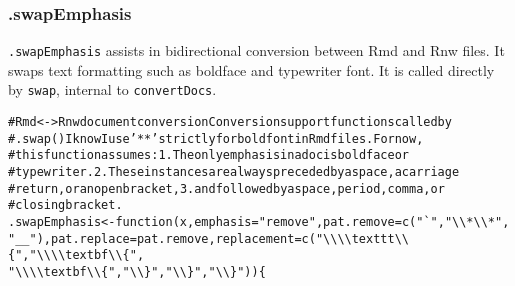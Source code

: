 \documentclass{article}\usepackage[]{graphicx}\usepackage[]{color}
\makeatletter
\newcommand{\hlstr}[1]{\textcolor[rgb]{0.863,0.196,0.184}{#1}}%
\newcommand{\hlcom}[1]{\textcolor[rgb]{0.345,0.431,0.459}{#1}}%
\newcommand{\hlstd}[1]{\textcolor[rgb]{0.514,0.58,0.588}{#1}}%
\newcommand{\hlkwa}[1]{\textcolor[rgb]{0.796,0.294,0.086}{#1}}%
\newcommand{\hlkwb}[1]{\textcolor[rgb]{0.522,0.6,0}{#1}}%
\newcommand{\hlkwc}[1]{\textcolor[rgb]{0.796,0.294,0.086}{#1}}%
\newcommand{\hlkwd}[1]{\textcolor[rgb]{0.576,0.631,0.631}{#1}}%
\newenvironment{kframe}{%
 \def\at@end@of@kframe{}%
 \ifinner\ifhmode%
  \def\at@end@of@kframe{\end{minipage}}%
  \begin{minipage}{\columnwidth}%
 \fi\fi%
 \def\FrameCommand##1{\hskip\@totalleftmargin \hskip-\fboxsep
 \colorbox{shadecolor}{##1}\hskip-\fboxsep
     \hskip-\linewidth \hskip-\@totalleftmargin \hskip\columnwidth}%
 \MakeFramed {\advance\hsize-\width
   \@totalleftmargin\z@ \linewidth\hsize
   \@setminipage}}%
 {\par\unskip\endMakeFramed%
 \at@end@of@kframe}
\newenvironment{knitrout}{}{} %
\makeatother
\begin{document}
\subsubsection{.swapEmphasis}
\texttt{.swapEmphasis} assists in bidirectional conversion between Rmd and Rnw files.
It swaps text formatting such as boldface and typewriter font.
It is called directly by \texttt{swap}, internal to \texttt{convertDocs}.


\begin{knitrout}
\color{fgcolor}\begin{kframe}
\begin{alltt}
\hlcom{# Rmd <-> Rnw document conversion Conversion support functions called by}
\hlcom{# .swap() I know I use '**' strictly for bold font in Rmd files.  For now,}
\hlcom{# this function assumes: 1. The only emphasis in a doc is boldface or}
\hlcom{# typewriter.  2. These instances are always preceded by a space, a carriage}
\hlcom{# return, or an open bracket, 3. and followed by a space, period, comma, or}
\hlcom{# closing bracket.}
\hlstd{.swapEmphasis} \hlkwb{<-} \hlkwa{function}\hlstd{(}\hlkwc{x}\hlstd{,} \hlkwc{emphasis} \hlstd{=} \hlstr{"remove"}\hlstd{,} \hlkwc{pat.remove} \hlstd{=} \hlkwd{c}\hlstd{(}\hlstr{"`"}\hlstd{,} \hlstr{"\textbackslash{}\textbackslash{}*\textbackslash{}\textbackslash{}*"}\hlstd{,}
    \hlstr{"__"}\hlstd{),} \hlkwc{pat.replace} \hlstd{= pat.remove,} \hlkwc{replacement} \hlstd{=} \hlkwd{c}\hlstd{(}\hlstr{"\textbackslash{}\textbackslash{}\textbackslash{}\textbackslash{}texttt\textbackslash{}\textbackslash{}\{"}\hlstd{,} \hlstr{"\textbackslash{}\textbackslash{}\textbackslash{}\textbackslash{}textbf\textbackslash{}\textbackslash{}\{"}\hlstd{,}
    \hlstr{"\textbackslash{}\textbackslash{}\textbackslash{}\textbackslash{}textbf\textbackslash{}\textbackslash{}\{"}\hlstd{,} \hlstr{"\textbackslash{}\textbackslash{}\}"}\hlstd{,} \hlstr{"\textbackslash{}\textbackslash{}\}"}\hlstd{,} \hlstr{"\textbackslash{}\textbackslash{}\}"}\hlstd{)) \{}


\end{alltt}
\end{kframe}
\end{knitrout}
\end{document}
